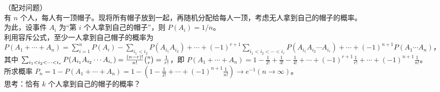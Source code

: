 \documentclass[../main.tex]{subfiles}
\begin{document}
\begin{example}
（配对问题）\\
有 $n$ 个人，每人有一顶帽子。现将所有帽子放到一起，再随机分配给每人一顶，考虑无人拿到自己的帽子的概率。\\
为此，设事件 $A_i$ 为“第 $i$ 个人拿到自己的帽子”，则 $P(A_i)=1/n$。\\
利用容斥公式，至少一人拿到自己帽子的概率为 $P(A_1+\cdots+A_n)=\sum_{i=1}^n P(A_i)-\sum_{i_1<i_2}P(A_{i_1}A_{i_2})+\cdots+(-1)^{r+1}\sum_{i_1<i_2<\cdots<i_r}P(A_{i_1}A_{i_2}\cdots A_{i_r})+\cdots+(-1)^{n+1}P(A_1\cdots A_n)$，\\
其中 $\sum_{i_1<i_2<\cdots<i_r}P(A_{i_1}A_{i_2}\cdots A_{i_r})=\frac{(n-r)!}{n!}\tbinom{n}{r}=\frac{1}{r!}$，即 $P(A_1+\cdots+A_n)=1-\frac{1}{2!}+\frac{1}{3!}-\frac{1}{4!}+\cdots+(-1)^{r+1}\frac{1}{r!}+\cdots+(-1)^{n+1}\frac{1}{n!}$。\\
所求概率 $P_n=1-P(A_1+\cdots+A_n)=1-(1-\frac{1}{2!}+\cdots+(-1)^{n+1}\frac{1}{n!})\rightarrow e^{-1}(n\rightarrow\infty)$。\\
思考：恰有 $k$ 个人拿到自己的帽子的概率？
\end{example}
\end{document}
